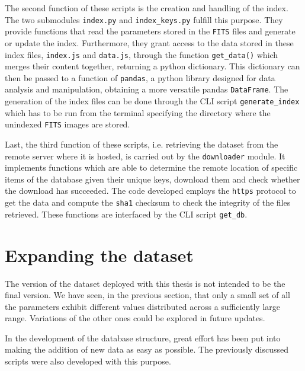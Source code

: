 \documentclass[a4paper,10pt]{report}
\begin{document}
The second function of these scripts is the creation and handling of the index.
The two submodules \lstinline{index.py} and \lstinline{index_keys.py} fulfill this purpose.
They provide functions
that read the parameters stored in the \lstinline{FITS} files and generate or update the
index. Furthermore, they grant access to the data stored in these index files,
\lstinline{index.js} and \lstinline{data.js}, 
through the function \lstinline{get_data()}
which merges their content together, returning a python dictionary.
This dictionary can then be passed to a function of \lstinline{pandas},
a python library designed for data analysis and manipulation, obtaining a more versatile pandas \lstinline{DataFrame}.
The generation of the index files can be done through the CLI script \lstinline{generate_index} which has to be run from 
the terminal specifying the directory where the unindexed \lstinline{FITS} images are stored.

Last, the third function of these scripts, i.e. retrieving the dataset from the remote server where
it is hosted, is carried out by the \lstinline{downloader} module.
It implements functions which are able to determine the remote location of specific items of the database 
given their unique keys, download them and check whether the download has succeeded.
The code developed employs the \lstinline{https} protocol to get the data and compute the \lstinline{sha1} 
checksum to check the integrity of the files retrieved.
These functions are interfaced by the CLI script \lstinline{get_db}.

\section{Expanding the dataset}

The version of the dataset deployed with this thesis is not intended to be the final version. 
We have seen, in the previous section, that only a small set of all the parameters exhibit different values distributed
across a sufficiently large range. Variations of the other ones could be explored in future updates.

In the development of the database structure, great effort has been put into making the addition of new
data as easy as possible. The previously discussed scripts were also developed with this purpose.
\end{document}
